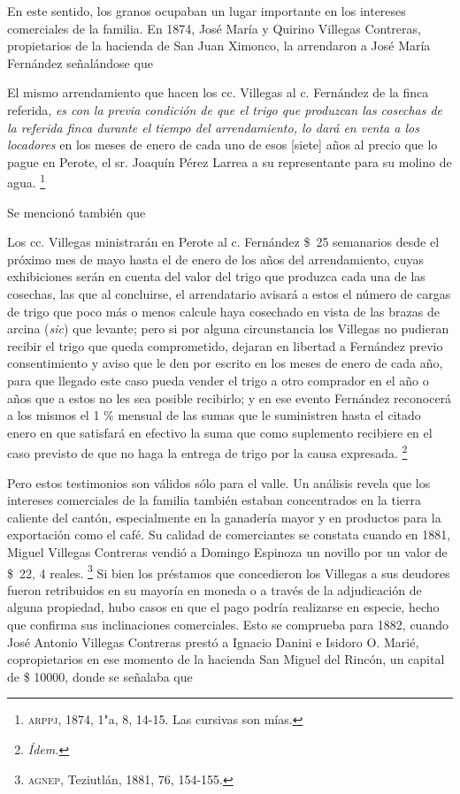\documentclass[14pt,twoside,final]{extbook} %
\let\oldfootnote\footnote
\renewcommand\footnote[1]{%
\oldfootnote{\hspace{1mm}#1}}
\begin{document}
En este sentido, los granos ocupaban un lugar importante en los intereses comerciales de la familia. En 1874, José María y Quirino Villegas Contreras, propietarios de la hacienda de San Juan Ximonco, la arrendaron a José María Fernández señalándose que 
\begin{quoting}
El mismo arrendamiento que hacen los cc. Villegas al c. Fernández de la finca referida, \emph{es con la previa condición de que el trigo que produzcan las cosechas de la referida finca durante el tiempo del arrendamiento, lo dará en venta a los locadores} en los meses de enero de cada uno de esos [siete] años al precio que lo pague en Perote, el sr. Joaquín Pérez Larrea a su representante para su molino de agua.\footnote{\textsc{arppj}, 1874, 1"a, 8, 14-15. Las cursivas son mías.} 
\end{quoting}
Se mencionó también que 
\begin{quoting}
Los cc. Villegas ministrarán en Perote al c. Fernández \$~25 semanarios desde el próximo mes de mayo hasta el de enero de los años del arrendamiento, cuyas exhibiciones serán en cuenta del valor del trigo que produzca cada una de las cosechas, las que al concluirse, el arrendatario avisará a estos el número de cargas de trigo que poco más o menos calcule haya cosechado en vista de las brazas de arcina (\emph{sic}) que levante; pero si por alguna circunstancia los Villegas no pudieran recibir el trigo que queda comprometido, dejaran en libertad a Fernández previo consentimiento y aviso que le den por escrito en los meses de enero de cada año, para que llegado este caso pueda vender el trigo a otro comprador en el año o años que a estos no les sea posible recibirlo; y en ese evento Fernández reconocerá a los mismos el 1 \% mensual de las sumas que le suministren hasta el citado enero en que satisfará en efectivo la suma que como suplemento recibiere en el caso previsto de que no haga la entrega de trigo por la causa expresada.\footnote{\em Ídem.}
\end{quoting}
Pero estos testimonios son válidos sólo para el valle. Un análisis revela que los intereses comerciales de la familia también estaban concentrados en la tierra caliente del cantón, especialmente en la ganadería mayor y en productos para la exportación como el café. Su calidad de comerciantes se constata cuando en 1881, Miguel Villegas Contreras vendió a Domingo Espinoza un novillo por un valor de \$~22, 4 reales.\footnote{\textsc{agnep}, Teziutlán, 1881, 76, 154-155.} Si bien los préstamos que concedieron los Villegas a sus deudores fueron retribuidos en su mayoría en moneda o a través de la adjudicación de alguna propiedad, hubo casos en que el pago podría realizarse en especie, hecho que confirma sus inclinaciones comerciales. Esto se comprueba para 1882, cuando José Antonio Villegas Contreras prestó a Ignacio Danini e Isidoro O. Marié, copropietarios en ese momento de la hacienda San Miguel del Rincón, un capital de \$ 10000, donde se señalaba que
\end{document}
